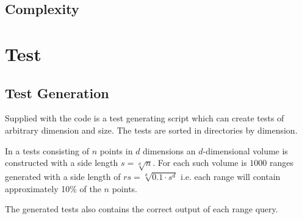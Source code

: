 \documentclass{article}
\begin{document}
\subsection{Complexity}
\section{Test}
  \subsection{Test Generation}
    Supplied with the code is a test generating script which can create tests of
    arbitrary dimension and size. The tests are sorted in directories by 
    dimension.
    
    In a tests consisting of $n$ points in $d$ dimensions an $d$-dimensional 
    volume is constructed with a side length $s = \sqrt[d]{n}$. For each such 
    volume is $1000$ ranges generated with a side length of 
    $rs = \sqrt[d]{0.1 \cdot s^d}$ i.e. each range will contain approximately 
    10\% of the $n$ points. 
    
    The generated tests also contains the correct output of each range query.
    
    
\end{document}
